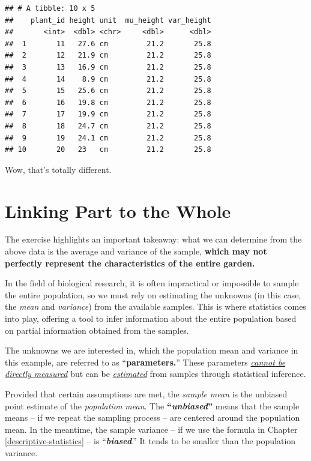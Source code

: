 \documentclass[
]{book}
\begin{document}
\begin{verbatim}
## # A tibble: 10 x 5
##    plant_id height unit  mu_height var_height
##       <int>  <dbl> <chr>     <dbl>      <dbl>
##  1       11   27.6 cm         21.2       25.8
##  2       12   21.9 cm         21.2       25.8
##  3       13   16.9 cm         21.2       25.8
##  4       14    8.9 cm         21.2       25.8
##  5       15   25.6 cm         21.2       25.8
##  6       16   19.8 cm         21.2       25.8
##  7       17   19.9 cm         21.2       25.8
##  8       18   24.7 cm         21.2       25.8
##  9       19   24.1 cm         21.2       25.8
## 10       20   23   cm         21.2       25.8
\end{verbatim}

Wow, that's totally different.

\hypertarget{linking-part-to-the-whole}{%
\section{Linking Part to the Whole}\label{linking-part-to-the-whole}}

The exercise highlights an important takeaway: what we can determine from the above data is the average and variance of the sample, \textbf{which may not perfectly represent the characteristics of the entire garden.}

In the field of biological research, it is often impractical or impossible to sample the entire population, so we must rely on estimating the unknowns (in this case, the \emph{mean} and \emph{variance}) from the available samples. This is where statistics comes into play, offering a tool to infer information about the entire population based on partial information obtained from the samples.

The unknowns we are interested in, which the population mean and variance in this example, are referred to as ``\textbf{parameters.}'' These parameters \uline{\emph{cannot be directly measured}} but can be \uline{\emph{estimated}} from samples through statistical inference.

Provided that certain assumptions are met, the \emph{sample mean} is the unbiased point estimate of the \emph{population} \emph{mean}. The \textbf{``\emph{unbiased}''} means that the sample means -- if we repeat the sampling process -- are centered around the population mean. In the meantime, the sample variance -- if we use the formula in Chapter \ref{descriptive-statistics} -- is ``\textbf{\emph{biased}}.'' It tends to be smaller than the population variance.
\end{document}
